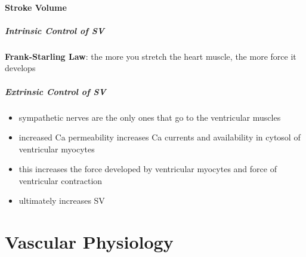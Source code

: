 \documentclass[10pt]{article}
\begin{document}
\subsection{Stroke Volume}
\subsubsection{Intrinsic Control of SV}
\begin{theorem}
    \textbf{Frank-Starling Law}: the more you stretch the heart muscle, the more force it develops
\end{theorem}
\subsubsection{Extrinsic Control of SV}
\begin{itemize}
    \item sympathetic nerves are the only ones that go to the ventricular muscles
    \item increased Ca permeability increases Ca currents and availability in cytosol of ventricular myocytes
    \item this increases the force developed by ventricular myocytes and force of ventricular contraction
    \item ultimately increases SV
\end{itemize}













\part{Vascular Physiology}
\end{document}
